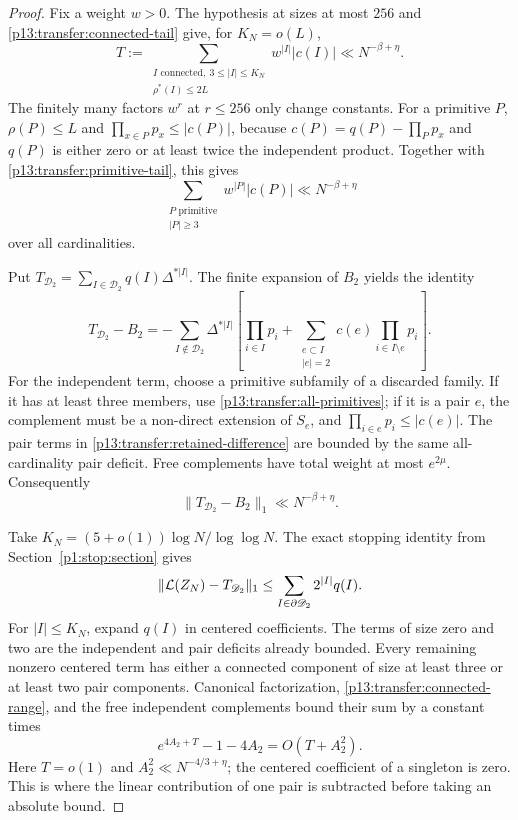 \begin{proof}
Fix a weight $w>0$. The hypothesis at sizes at most $256$ and
\eqref{p13:transfer:connected-tail} give, for $K_N=o(L)$,
\begin{equation}
 T:=\sum_{\substack{I\text{ connected},\ 3\leq|I|\leq K_N\\
                             \rho^*(I)\leq2L}}
                  w^{|I|}|c(I)|\ll N^{-\beta+\eta}.
 \label{p13:transfer:connected-range}
\end{equation}
The finitely many factors $w^r$ at $r\leq256$ only change constants.
For a primitive $P$, $\rho(P)\leq L$ and
$\prod_{x\in P}p_x\leq|c(P)|$, because
$c(P)=q(P)-\prod_Pp_x$ and $q(P)$ is either zero or at least twice
the independent product. Together with
\eqref{p13:transfer:primitive-tail}, this gives
\begin{equation}
 \sum_{\substack{P\text{ primitive}\\|P|\geq3}}
                     w^{|P|}|c(P)|\ll N^{-\beta+\eta}
 \label{p13:transfer:all-primitives}
\end{equation}
over all cardinalities.

Put $T_{\mathscr D_2}=\sum_{I\in\mathscr D_2}q(I)\Delta^{*|I|}$.
The finite expansion of $B_2$ yields the identity
\begin{equation}
 T_{\mathscr D_2}-B_2
 =-\sum_{I\notin\mathscr D_2}\Delta^{*|I|}
       \left[\prod_{i\in I}p_i+
          \sum_{\substack{e\subset I\\|e|=2}}
                   c(e)\prod_{i\in I\setminus e}p_i\right].
 \label{p13:transfer:retained-difference}
\end{equation}
For the independent term, choose a primitive subfamily of a discarded
family. If it has at least three members, use
\eqref{p13:transfer:all-primitives}; if it is a pair $e$, the complement
must be a non-direct extension of $S_e$, and
$\prod_{i\in e}p_i\leq|c(e)|$.
The pair terms in \eqref{p13:transfer:retained-difference} are bounded
by the same all-cardinality pair deficit. Free complements have total
weight at most $e^{2\mu}$. Consequently
\begin{equation}
 \|T_{\mathscr D_2}-B_2\|_1\ll N^{-\beta+\eta}.
 \label{p13:transfer:retained-error}
\end{equation}

Take $K_N=(5+o(1))\log N/\log\log N$.
The exact stopping identity from Section~\ref{p1:stop:section} gives
\[
 \|\mathcal L(Z_N)-T_{\mathscr D_2}\|_1
       \leq\sum_{I\in\partial\mathscr D_2}2^{|I|}q(I).
\]
For $|I|\leq K_N$, expand $q(I)$ in centered coefficients. The terms
of size zero and two are the independent and pair deficits already
bounded. Every remaining nonzero centered term has either a connected
component of size at least three or at least two pair components.
Canonical factorization, \eqref{p13:transfer:connected-range}, and
the free independent complements bound their sum by a constant times
\[
 e^{4A_2+T}-1-4A_2=O(T+A_2^2).
\]
Here $T=o(1)$ and $A_2^2\ll N^{-4/3+\eta}$; the centered coefficient
of a singleton is zero. This is where the linear contribution of one
pair is subtracted before taking an absolute bound.


\end{proof}
